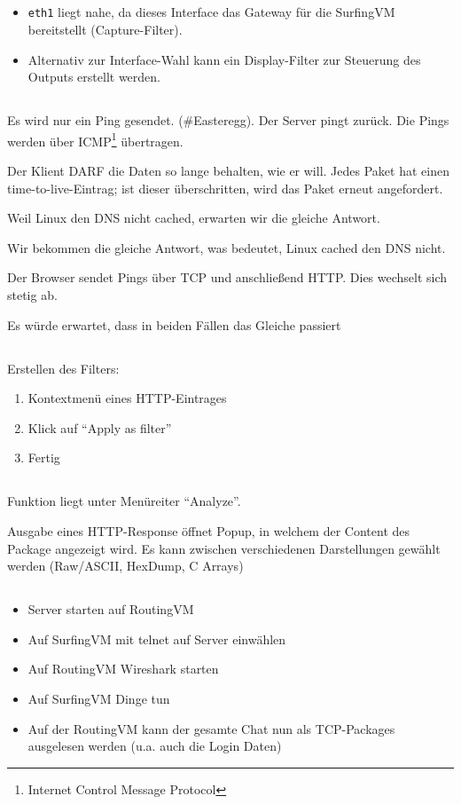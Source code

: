 \documentclass[twoside]{article}
\newcommand{\ttt}[1]{%
	\texttt{#1}%
}
\begin{document}
\subsection{}
\begin{itemize}
	\item \ttt{eth1} liegt nahe, da dieses Interface das Gateway für die SurfingVM bereitstellt (Capture-Filter).
	\item Alternativ zur Interface-Wahl kann ein Display-Filter zur Steuerung des Outputs erstellt werden.
\end{itemize}
\subsection{}
Es wird nur ein Ping gesendet. (\#Easteregg).
Der Server pingt zurück.
Die Pings werden über ICMP\footnote{Internet Control Message Protocol} übertragen.

Der Klient DARF die Daten so lange behalten, wie er will.
Jedes Paket hat einen time-to-live-Eintrag; ist dieser überschritten, wird das Paket erneut angefordert.

Weil Linux den DNS nicht cached, erwarten wir die gleiche Antwort.

Wir bekommen die gleiche Antwort, was bedeutet, Linux cached den DNS nicht.

Der Browser sendet Pings über TCP und anschließend HTTP.
Dies wechselt sich stetig ab.

Es würde erwartet, dass in beiden Fällen das Gleiche passiert
\subsection{}
Erstellen des Filters:
\begin{enumerate}
	\item Kontextmenü eines HTTP-Eintrages
	\item Klick auf ``Apply as filter''
	\item Fertig
\end{enumerate}
\subsection{}
Funktion liegt unter Menüreiter ``Analyze''.

Ausgabe eines HTTP-Response öffnet Popup, in welchem der Content des Package angezeigt wird.
Es kann zwischen verschiedenen Darstellungen gewählt werden (Raw/ASCII, HexDump, C Arrays)
\subsection{}
\begin{itemize}
	\item Server starten auf RoutingVM
	\item Auf SurfingVM mit telnet auf Server einwählen
	\item Auf RoutingVM Wireshark starten
	\item Auf SurfingVM Dinge tun
	\item Auf der RoutingVM kann der gesamte Chat nun als TCP-Packages ausgelesen werden (u.a. auch die Login Daten)
\end{itemize}
\end{document}

